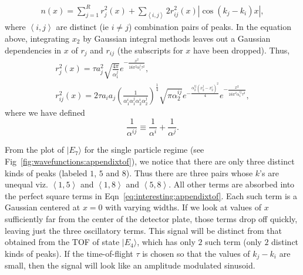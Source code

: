 \begin{eqnarray}
n(x)=\sum_{j=1}^{R}r^2_j(x) + \sum_{\left\langle i,j \right\rangle} 2r^2_{ij}(x) |\cos{(k_j-k_i)x}|,
\label{eq:interesting:appendixtof}
\end{eqnarray}
where $\left\langle i,j \right\rangle$ are distinct (ie $i \neq j$) combination pairs of peaks. In the equation above, integrating $x_2$ by Gaussian integral methods leaves out a Gaussian dependencies in $x$ of $r_j$ and $r_{ij}$ (the subscripts for $x$ have been dropped). Thus,
\begin{eqnarray}
r^2_j(x) = \tau a^2_j \sqrt{\frac{4\pi}{\alpha^j_1}}  e^{-\frac{x^2}{16\pi^2\alpha^j_1\tau^2}}, \nonumber \\
r^2_{ij}(x)=2 \tau a_i a_j \left(\frac{1}{ \alpha^i_1 \alpha^j_1 \alpha^i_2 \alpha^j_2} \right)^\frac{1}{4} \sqrt{\pi\alpha^{ij}_2} e^{-\frac{\alpha^{ij}_2(x^j_2-x^i_2)^2}{4}} e^{-\frac{x^2}{16 \pi^2 \alpha^{ij}_1\tau^2}},
\end{eqnarray}
where we have defined
\begin{equation}
\frac{1}{\alpha^{ij}}\equiv \frac{1}{\alpha^i}+\frac{1}{\alpha^j}.
\end{equation}

From the plot of $|E_7\rangle$ for the single particle regime (see Fig~\ref{fig:wavefunctions:appendixtof}), we notice that there are only three distinct kinds of peaks (labeled $1$, $5$ and $8$). Thus there are three pairs whose $k$'s are unequal viz. $\left\langle 1,5 \right\rangle$ and $\left\langle 1,8 \right\rangle$ and $\left\langle 5,8 \right\rangle$. All other terms are absorbed into the perfect square terms in Eqn~\ref{eq:interesting:appendixtof}. Each such term is a Gaussian centered at $x=0$ with varying widths. If we look at values of $x$ sufficiently far from the center of the detector plate, those terms drop off quickly, leaving just the three oscillatory terms. This signal will be distinct from that obtained from the TOF of state $|E_4\rangle$, which has only $2$ such term (only $2$ distinct kinds of peaks). If the time-of-flight $\tau$ is chosen so that the values of $k_j-k_i$ are small, then the signal will look like an amplitude modulated sinusoid. 

